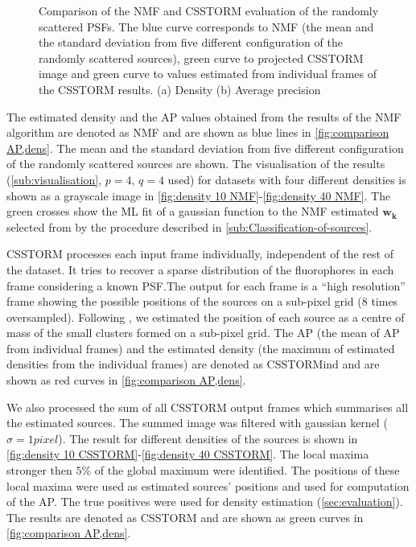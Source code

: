 \begin{figure}[!h]
	\centering
	\newcommand{\sizef}{.38}
	
	\caption{Comparison of the NMF and CSSTORM evaluation of the randomly scattered PSFs. The blue curve corresponds to NMF (the mean and the standard deviation from five different configuration of the randomly scattered sources), green curve to projected CSSTORM image and green curve to values estimated from individual frames of the CSSTORM results. (a) Density (b) Average precision}
	\label{fig:comparison AP,dens}
\end{figure}
%
The estimated density and the AP values obtained from the results of the NMF algorithm are denoted as \textsf{NMF} and are shown as blue lines in \autoref{fig:comparison AP,dens}. The mean and the standard deviation from five different configuration of the randomly scattered sources are shown. The visualisation of the results (\autoref{sub:visualisation}, $p=4,\,q=4$ used) for datasets with four different densities is shown as a grayscale image in \autoref{fig:density 10 NMF}-\ref{fig:density 40 NMF}. The green crosses show the ML fit of a gaussian function to the NMF estimated $\bm{w_{k}}$ selected from by the procedure described in \autoref{sub:Classification-of-sources}.

CSSTORM processes each input frame individually, independent of the rest of the dataset. It tries to recover a sparse distribution of the fluorophores in each frame considering a known PSF.The output for each frame is a ``high resolution'' frame showing the possible positions of the sources on a sub-pixel grid (8 times oversampled). Following \cite{Zhu2012}, we estimated the position of each source as a centre of mass of the small clusters formed on a sub-pixel grid. The AP (the mean of AP from individual frames) and the estimated density (the maximum of estimated densities from the individual frames) are denoted as \textsf{CSSTORMind} and are shown as red curves in \autoref{fig:comparison AP,dens}.

We also processed the sum of all CSSTORM output frames which summarises all the estimated sources. The summed image was filtered with gaussian kernel ($\sigma=1\unit{pixel}$). The result for different densities of the sources is shown in \autoref{fig:density 10 CSSTORM}-\ref{fig:density 40 CSSTORM}. The local maxima stronger then $5\%$ of the global maximum were identified. The positions of these local maxima were used as estimated sources' positions and used for computation of the AP. The true positives were used for density estimation (\autoref{sec:evaluation}). The results are denoted as \textsf{CSSTORM} and are shown as green curves in \autoref{fig:comparison AP,dens}.

